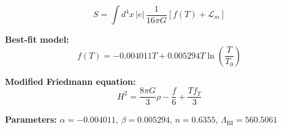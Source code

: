 
\begin{equation}
  S = \int d^4x \, |e| \, \frac{1}{16\pi G} \left[ f(T) + \mathcal{L}_m \right]
\end{equation}

\textbf{Best-fit model:}
\begin{equation}
  f(T) = -0.004011 T + 0.005294 T \ln\!\left(\frac{T}{T_0}\right)
\end{equation}

\textbf{Modified Friedmann equation:}
\begin{equation}
  H^2 = \frac{8\pi G}{3} \rho - \frac{f}{6} + \frac{T f_T}{3}
\end{equation}

\textbf{Parameters:}
$\alpha = -0.004011$, \quad
$\beta = 0.005294$, \quad
$n = 0.6355$, \quad
$\Lambda_{\text{BI}} = 560.5061$